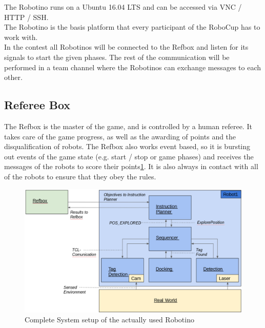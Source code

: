 The Robotino runs on a Ubuntu 16.04 LTS and can be accessed via VNC / HTTP / SSH.\\

The Robotino is the basis platform that every participant of the RoboCup has to work with.\\
In the contest all Robotinos will be connected to the Refbox and listen for its signals to start the given phases.
The rest of the communication will be performed in a team channel where the Robotinos can exchange messages to each other.
\newpage

\subsection{Referee Box}
The Refbox is the master of the game, and is controlled by a human referee. It takes care of the game progress, as well as the awarding of points and the disqualification of robots.
The Refbox also works event based, so it is bursting out events of the game state (e.g. start / stop or game phases) and receives the messages of the robots to score their points\ref{fig:struct_wRefBox}.
It is also always in contact with all of the robots to ensure that they obey the rules.

\begin{figure}[h]
\centering
\includegraphics[scale=0.23]{pic/struckture_wRefbo.png}
\caption{Complete System setup of the actually used Robotino}
\label{fig:struct_wRefBox}
\end{figure}
